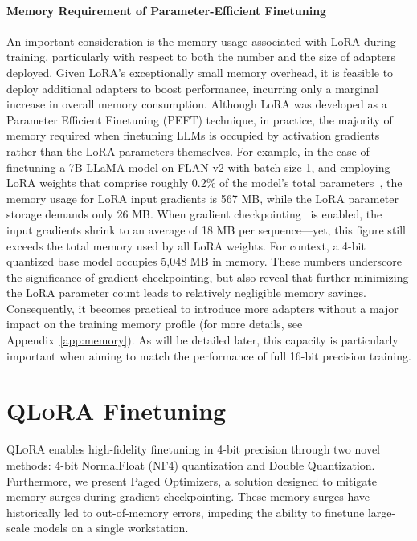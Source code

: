 \paragraph{Memory Requirement of Parameter-Efficient Finetuning} An important consideration is the memory usage associated with LoRA during training, particularly with respect to both the number and the size of adapters deployed. Given LoRA's exceptionally small memory overhead, it is feasible to deploy additional adapters to boost performance, incurring only a marginal increase in overall memory consumption. Although LoRA was developed as a Parameter Efficient Finetuning (PEFT) technique, in practice, the majority of memory required when finetuning LLMs is occupied by activation gradients rather than the LoRA parameters themselves. For example, in the case of finetuning a 7B LLaMA model on FLAN v2 with batch size 1, and employing LoRA weights that comprise roughly 0.2\% of the model’s total parameters~\citep{hu2021lora,liu2022few}, the memory usage for LoRA input gradients is 567 MB, while the LoRA parameter storage demands only 26 MB. When gradient checkpointing~\citep{chen2016training} is enabled, the input gradients shrink to an average of 18 MB per sequence—yet, this figure still exceeds the total memory used by all LoRA weights. For context, a 4-bit quantized base model occupies 5,048 MB in memory. These numbers underscore the significance of gradient checkpointing, but also reveal that further minimizing the LoRA parameter count leads to relatively negligible memory savings. Consequently, it becomes practical to introduce more adapters without a major impact on the training memory profile (for more details, see Appendix~\ref{app:memory}). As will be detailed later, this capacity is particularly important when aiming to match the performance of full 16-bit precision training.

\section{\textsc{QLoRA} Finetuning}

\textsc{QLoRA} enables high-fidelity finetuning in 4-bit precision through two novel methods: 4-bit NormalFloat (NF4) quantization and Double Quantization. Furthermore, we present Paged Optimizers, a solution designed to mitigate memory surges during gradient checkpointing. These memory surges have historically led to out-of-memory errors, impeding the ability to finetune large-scale models on a single workstation.

